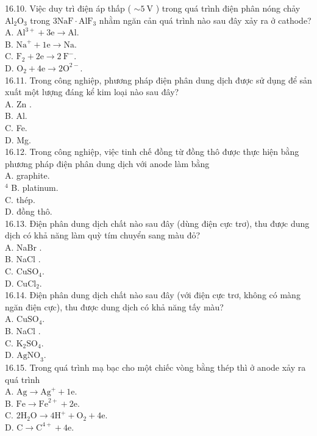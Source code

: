 \documentclass[10pt]{article}
\begin{document}
16.10. Việc duy trì điện áp thấp ( $\sim 5 \mathrm{~V}$ ) trong quá trình điện phân nóng chảy $\mathrm{Al}_{2} \mathrm{O}_{3}$ trong $3 \mathrm{NaF} \cdot \mathrm{AlF}_{3}$ nhằm ngăn cản quá trình nào sau đây xảy ra ở cathode?\\
A. $\mathrm{Al}^{3+}+3 \mathrm{e} \rightarrow \mathrm{Al}$.\\
B. $\mathrm{Na}^{+}+1 \mathrm{e} \rightarrow \mathrm{Na}$.\\
C. $\mathrm{F}_{2}+2 \mathrm{e} \rightarrow 2 \mathrm{~F}^{-}$.\\
D. $\mathrm{O}_{2}+4 \mathrm{e} \rightarrow 2 \mathrm{O}^{2-}$.\\
16.11. Trong công nghiệp, phương pháp điện phân dung dịch được sử dụng để sản xuất một lượng đáng kể kim loại nào sau đây?\\
A. Zn .\\
B. Al.\\
C. Fe.\\
D. Mg.\\
16.12. Trong công nghiệp, việc tinh chế đồng từ đồng thô được thực hiện bằng phương pháp điện phân dung dịch với anode làm bằng\\
A. graphite.\\
${ }^{4}$ B. platinum.\\
C. thép.\\
D. đồng thô.\\
16.13. Điện phân dung dịch chất nào sau đây (dùng điện cực trơ), thu được dung dịch có khả năng làm quỳ tím chuyển sang màu đỏ?\\
A. NaBr .\\
B. NaCl .\\
C. $\mathrm{CuSO}_{4}$.\\
D. $\mathrm{CuCl}_{2}$.\\
16.14. Điện phân dung dịch chất nào sau đây (với điện cực trơ, không có màng ngăn điện cực), thu được dung dịch có khả năng tấy màu?\\
A. $\mathrm{CuSO}_{4}$.\\
B. NaCl .\\
C. $\mathrm{K}_{2} \mathrm{SO}_{4}$.\\
D. $\mathrm{AgNO}_{3}$.\\
16.15. Trong quá trình mạ bạc cho một chiếc vòng bằng thép thì ở anode xảy ra quá trình\\
A. $\mathrm{Ag} \rightarrow \mathrm{Ag}^{+}+1 \mathrm{e}$.\\
B. $\mathrm{Fe} \rightarrow \mathrm{Fe}^{2+}+2 \mathrm{e}$.\\
C. $2 \mathrm{H}_{2} \mathrm{O} \rightarrow 4 \mathrm{H}^{+}+\mathrm{O}_{2}+4 \mathrm{e}$.\\
D. $\mathrm{C} \rightarrow \mathrm{C}^{4+}+4 \mathrm{e}$.
\end{document}
